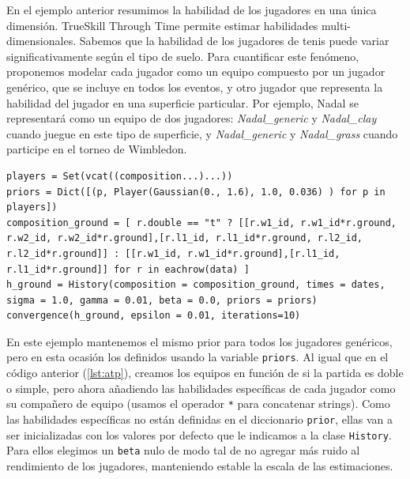 \documentclass[a4paper,11pt]{book}
\theoremstyle{definition}
\newif\ifen
\newcommand{\en}[1]{\ifen#1\fi}
\begin{document}
En el ejemplo anterior resumimos la habilidad de los jugadores en una \'unica dimensi\'on.
%
TrueSkill Through Time permite estimar habilidades multi-dimensionales.
%
Sabemos que la habilidad de los jugadores de tenis puede variar significativamente seg\'un el tipo de suelo.
%
\en{To quantify this phenomenon, we propose modeling each player as a team composed of a generic player, who is included in all the games, and another player representing the ability of the player on a particular surface. } %
Para cuantificar este fen\'omeno, proponemos modelar cada jugador como un equipo compuesto por un jugador gen\'erico, que se incluye en todos los eventos, y otro jugador que representa la habilidad del jugador en una superficie particular.
%
Por ejemplo, Nadal se representar\'a como un equipo de dos jugadores: \emph{Nadal\_generic} y \emph{Nadal\_clay} cuando juegue en este tipo de superficie, y \emph{Nadal\_generic} y \emph{Nadal\_grass} cuando participe en el torneo de Wimbledon.
\begin{lstlisting}[captionpos=b,backgroundcolor=\color{julia!60},label=lst:atp_ground, caption={Modelando habilidades multi-dimensionales en la historia de la ATP}, belowskip=0cm]
players = Set(vcat((composition...)...))
priors = Dict([(p, Player(Gaussian(0., 1.6), 1.0, 0.036) ) for p in players])
composition_ground = [ r.double == "t" ? [[r.w1_id, r.w1_id*r.ground, r.w2_id, r.w2_id*r.ground],[r.l1_id, r.l1_id*r.ground, r.l2_id, r.l2_id*r.ground]] : [[r.w1_id, r.w1_id*r.ground],[r.l1_id, r.l1_id*r.ground]] for r in eachrow(data) ]
h_ground = History(composition = composition_ground, times = dates, sigma = 1.0, gamma = 0.01, beta = 0.0, priors = priors)
convergence(h_ground, epsilon = 0.01, iterations=10)
\end{lstlisting}
%
En este ejemplo mantenemos el mismo prior para todos los jugadores gen\'ericos, pero en esta ocasi\'on los definidos usando la variable \texttt{priors}.
%
Al igual que en el c\'odigo anterior (\ref{lst:atp}), creamos los equipos en funci\'on de si la partida es doble o simple, pero ahora a\~nadiendo las habilidades espec\'ificas de cada jugador como su compa\~nero de equipo (usamos el operador \texttt{*} para concatenar strings).
%
Como las habilidades espec\'ificas no est\'an definidas en el diccionario \texttt{prior}, ellas van a ser inicializadas con los valores por defecto que le indicamos a la clase \texttt{History}.
%
Para ellos elegimos un \texttt{beta} nulo de modo tal de no agregar m\'as ruido al rendimiento de los jugadores, manteniendo estable la escala de las estimaciones.
\end{document}
